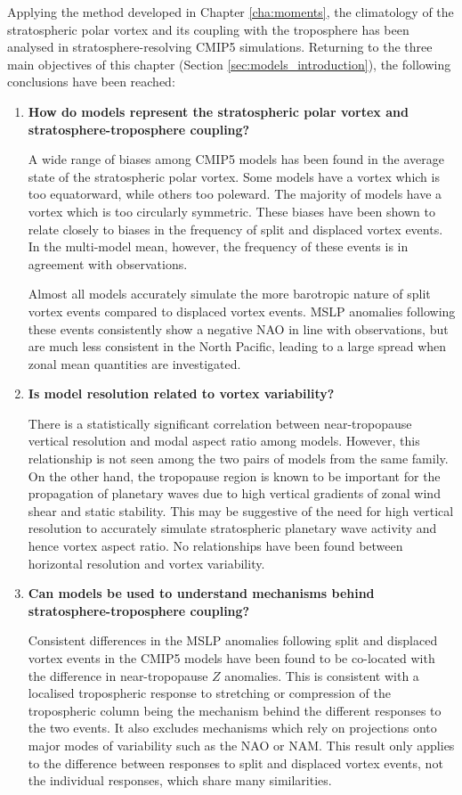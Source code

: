 Applying the method developed in Chapter \ref{cha:moments}, the climatology of
the stratospheric polar vortex and its coupling with the troposphere has been
analysed in stratosphere-resolving CMIP5 simulations. Returning to the three
main objectives of this chapter (Section \ref{sec:models_introduction}), the
following conclusions have been reached:
\begin{enumerate}

\item \textbf{How do models represent the stratospheric polar vortex and
    stratosphere-troposphere coupling?}

  A wide range of biases among CMIP5 models has been found in the average state
  of the stratospheric polar vortex. Some models have a vortex which is too
  equatorward, while others too poleward. The majority of models have a vortex
  which is too circularly symmetric. These biases have been shown to relate
  closely to biases in the frequency of split and displaced vortex events. In
  the multi-model mean, however, the frequency of these events is in agreement
  with observations. 

  Almost all models accurately simulate the more barotropic nature of split
  vortex events compared to displaced vortex events. MSLP anomalies following
  these events consistently show a negative NAO in line with observations, but
  are much less consistent in the North Pacific, leading to a large spread when
  zonal mean quantities are investigated.

\item \textbf{Is model resolution related to vortex variability?}

  There is a statistically significant correlation between near-tropopause
  vertical resolution and modal aspect ratio among models. However, this
  relationship is not seen among the two pairs of models from the same
  family. On the other hand, the tropopause region is known to be important for
  the propagation of planetary waves due to high vertical gradients of zonal
  wind shear and static stability. This may be suggestive of the need for high
  vertical resolution to accurately simulate stratospheric planetary wave
  activity and hence vortex aspect ratio. No relationships have been found
  between horizontal resolution and vortex variability.

\item \textbf{Can models be used to understand mechanisms behind
    stratosphere-troposphere coupling?}

  Consistent differences in the MSLP anomalies following split and displaced
  vortex events in the CMIP5 models have been found to be co-located with the
  difference in near-tropopause $Z$ anomalies. This is consistent with a
  localised tropospheric response to stretching or compression of the
  tropospheric column being the mechanism behind the different responses to the
  two events. It also excludes mechanisms which rely on projections onto major
  modes of variability such as the NAO or NAM. This result only applies to the
  difference between responses to split and displaced vortex events, not the
  individual responses, which share many similarities.
\end{enumerate}


